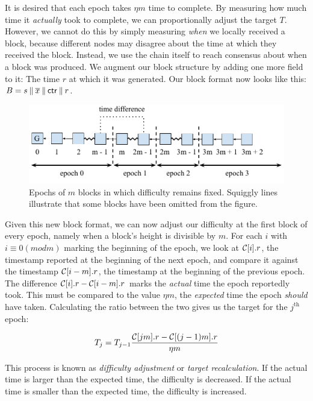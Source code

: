 It is desired that each epoch takes $\eta m$ time to complete.
By measuring how much time it \emph{actually} took to complete,
we can proportionally adjust the target $T$. However, we cannot
do this by simply measuring \emph{when} we locally received a block,
because different nodes may disagree about the time at which
they received the block. Instead, we use the chain itself to
reach consensus about when a block was produced. We augment
our block structure by adding one more field to it: The time $r$
at which it was generated. Our block format now looks like
this: $B = s \mathbin{\|} \overline{x} \mathbin{\|} \mathsf{ctr} \mathbin{\|} r$.

\begin{figure}[h]
  \centering
  \includegraphics[width=0.8 \columnwidth,keepaspectratio]{figures/pow-epochs.pdf}
  \caption{Epochs of $m$ blocks in which difficulty remains fixed. Squiggly lines
           illustrate that some blocks have been omitted from the figure.}
  \label{fig.pow-epochs}
\end{figure}

Given this new block format, we can now adjust our difficulty at
the first block of every epoch, namely when a block's height is
divisible by $m$. For each $i$ with $i \equiv 0 (mod m)$ marking
the beginning of the epoch, we look at $\mathcal{C}[i].r$, the timestamp
reported at the beginning of the next epoch, and compare it against
the timestamp $\mathcal{C}[i - m].r$, the timestamp at the beginning
of the previous epoch. The difference $\mathcal{C}[i].r - \mathcal{C}[i - m].r$
marks the \emph{actual} time the epoch reportedly took. This must
be compared to the value $\eta m$, the \emph{expected} time
the epoch \emph{should}
have taken. Calculating the ratio between the two gives us the
target for the $j^\text{th}$ epoch:

\[
    T_j = T_{j - 1} \frac{\mathcal{C}[jm].r - \mathcal{C}[(j - 1)m].r}{\eta m}
\]

This process is known as \emph{difficulty adjustment} or \emph{target
recalculation}. If the actual time is larger than the expected time,
the difficulty is decreased. If the actual time is smaller than the
expected time, the difficulty is increased.

